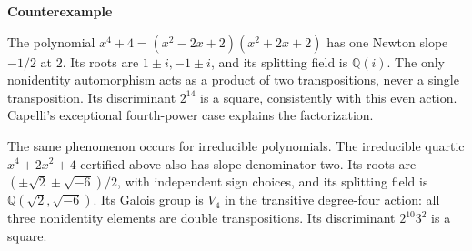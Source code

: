 \documentclass[11pt,a4paper,oneside,openany]{book}
\begin{document}
\begin{atlasblock}[boundary]
\textbf{\sffamily Counterexample}\par\smallskip
\color{black} The polynomial \(x^4+4=(x^2-2x+2)(x^2+2x+2)\) has one Newton slope \(-1/2\) at \(2\). Its roots are \(1\pm i,-1\pm i\), and its splitting field is \(\mathbb Q(i)\). The only nonidentity automorphism acts as a product of two transpositions, never a single transposition. Its discriminant \(2^{14}\) is a square, consistently with this even action. Capelli's exceptional fourth-power case explains the factorization.\par
\end{atlasblock}\color{black}

\color{black} The same phenomenon occurs for irreducible polynomials. The irreducible quartic \(x^4+2x^2+4\) certified above also has slope denominator two. Its roots are \((\pm\sqrt2\pm\sqrt{-6})/2\), with independent sign choices, and its splitting field is \(\mathbb Q(\sqrt2,\sqrt{-6})\). Its Galois group is \(V_4\) in the transitive degree-four action: all three nonidentity elements are double transpositions. Its discriminant \(2^{10}3^2\) is a square.\par
\end{document}
